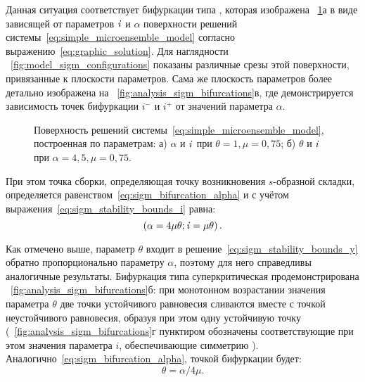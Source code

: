 Данная ситуация соответствует бифуркации типа , которая изображена \onfigure~\ref{fig:analysis_sigm_solution_surface}а в виде зависящей от параметров $\mathit{i}$ и $\alpha$ поверхности решений системы~\eqref{eq:simple_microensemble_model} согласно выражению~\eqref{eq:graphic_solution}. Для наглядности \onfigure~\ref{fig:model_sigm_configurations} показаны различные срезы этой поверхности, привязанные к плоскости параметров. Сама же плоскость параметров более детально изображена на \onfigure~\ref{fig:analysis_sigm_bifurcations}в, где демонстрируется зависимость точек бифуркации $i^{-}$ и $i^{+}$ от значений параметра $\alpha$. 
\begin{figure}[ht]
    \caption{Поверхность решений системы~\eqref{eq:simple_microensemble_model}, построенная по параметрам: а) $\alpha$ и $\mathit{i}$ при $\theta = 1, \mu = 0,75$; б) $\theta$ и $\mathit{i}$ при $\alpha = 4,5, \mu = 0,75$.}
    \label{fig:analysis_sigm_solution_surface}
\end{figure}
При этом \socalled точка сборки, определяющая точку возникновения $s$-образной складки, определяется равенством~\eqref{eq:sigm_bifurcation_alpha} и с учётом выражения~\eqref{eq:sigm_stability_bounds_i} равна:
\begin{equation}
    \nonumber
    \left(\alpha = 4 \mu \theta; \mathit{i} = \mu \theta\right).
\end{equation}

Как отмечено выше, параметр $\theta$ входит в решение~\eqref{eq:sigm_stability_bounds_y} обратно пропорционально параметру $\alpha$, поэтому для него справедливы аналогичные результаты. Бифуркация типа суперкритическая  продемонстрирована \onfigure~\ref{fig:analysis_sigm_bifurcations}б: при монотонном возрастании значения параметра $\theta$ две точки устойчивого равновесия сливаются вместе с точкой неустойчивого равновесия, образуя при этом одну устойчивую точку (\onfigure~\ref{fig:analysis_sigm_bifurcations}г пунктиром обозначены соответствующие при этом значения параметра $i$, обеспечивающие симметрию ). Аналогично~\eqref{eq:sigm_bifurcation_alpha}, точкой бифуркации будет:
\begin{equation}
    \label{eq:sigm_bifurcation_theta}
    \theta =  \alpha / 4 \mu.
\end{equation}

